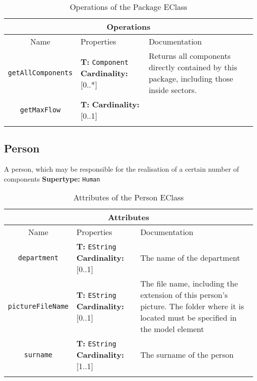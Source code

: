 \documentclass{article}
\begin{document}
\begin{table}[H]
\footnotesize
\begin{tabularx}{\textwidth}{|c| p{4 cm} | X |}
\hline
\multicolumn{3}{|c|}{\textbf{Operations}} \\
\hline
Name & Properties & Documentation \\ \hline \hline
\texttt{getAllComponents}
 & 
\textbf{T:} \texttt{Component}
\newline
\textbf{Cardinality:} [0..*]
 & Returns all components directly contained by this package, including those inside sectors.\\ \hline
\texttt{getMaxFlow}
 & 
\textbf{T:} \texttt{}
\newline
\textbf{Cardinality:} [0..1]
 & \\ \hline
\caption{Operations of the Package EClass}
\end{tabularx}
\label{e4smPackageop}
\end{table}
\subsection[Person]{Person}
\label{e4smPerson}

A person, which may be responsible for the realisation of a certain number of components
\textbf{Supertype: }\texttt{Human}
\begin{table}[H]
\footnotesize
\begin{tabularx}{\textwidth}{|c| p{4 cm} | X |}
\hline
\multicolumn{3}{|c|}{\textbf{Attributes}} \\
\hline
Name & Properties & Documentation \\ \hline \hline
\texttt{department}
 & 
\textbf{T:} \texttt{EString}
\newline
\textbf{Cardinality:} [0..1]
 & The name of the department\\ \hline
\texttt{pictureFileName}
 & 
\textbf{T:} \texttt{EString}
\newline
\textbf{Cardinality:} [0..1]
 & The file name, including the extension of this person's picture. The folder where it is located must be specified in the model element\\ \hline
\texttt{surname}
 & 
\textbf{T:} \texttt{EString}
\newline
\textbf{Cardinality:} [1..1]
 & The surname of the person\\ \hline
\caption{Attributes of the Person EClass}
\end{tabularx}
\label{e4smPersonattr}
\end{table}
\end{document}
